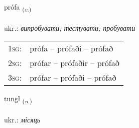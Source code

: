 \documentclass[frontgrid, backgrid]{flacards}\usepackage[]{graphicx}\usepackage[]{xcolor}
\begin{document}
\renewcommand{\flhead}{\vskip5pt \fboxsep=0pt {\small\bfseries\footnotesize Sagnorð | дієслово}}
\renewcommand{\fcfoot}{\vskip5pt \fboxsep=0pt \hspace{2pt}{\small\bfseries\footnotesize 2K}}

\renewcommand{\blhead}{\vskip5pt {\small\bfseries\footnotesize Sagnorð | дієслово }}
\renewcommand{\bcfoot}{\vskip5pt \hspace{2pt}{\small\bfseries\footnotesize 2K}}


{prófa \small{\textsubscript{(\textit{v.})}} \\[1ex] %
\textphonetic{[pʰrouːva]} \\
ukr.: \emph{випробувати; тестувати; пробувати} \\  [2ex]
\renewcommand*{\arraystretch}{0.8}
\begin{tabular}{p{1cm}l}
\textsc{1sg}: & prófa -- prófaði -- prófað \\ 
\textsc{2sg}: & prófar -- prófaðir -- prófað \\ 
\textsc{3sg}: & prófar -- prófaði -- prófað \\ 
\end{tabular}
}

\renewcommand{\flhead}{\vskip5pt \fboxsep=0pt {\small\bfseries\footnotesize Nafnorð | іменник}}
\renewcommand{\fcfoot}{\vskip5pt \fboxsep=0pt \hspace{2pt}{\small\bfseries\footnotesize 2K}}

\renewcommand{\blhead}{\vskip5pt {\small\bfseries\footnotesize Nafnorð | іменник }}
\renewcommand{\bcfoot}{\vskip5pt \hspace{2pt}{\small\bfseries\footnotesize 2K}}


{tungl \small{\textsubscript{(\textit{n.})}} \\[1ex] %
\textphonetic{[tʰuŋl]} \\
ukr.: \emph{місяць} \\  [2ex]
\renewcommand*{\arraystretch}{0.8}
}
\end{document}
